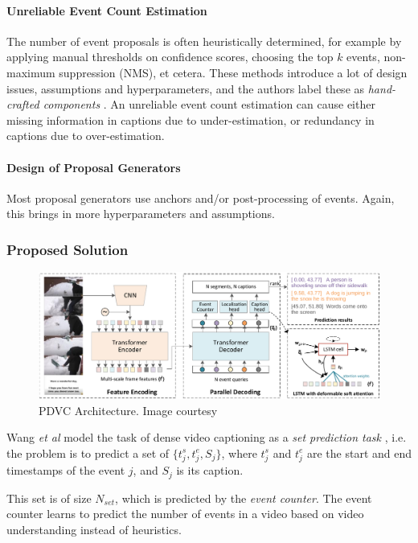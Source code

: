 \paragraph{Unreliable Event Count Estimation} The number of event proposals is often heuristically determined, for example by applying manual thresholds on confidence scores, choosing the top $k$ events, non-maximum suppression (NMS), et cetera. These methods introduce a lot of design issues, assumptions and hyperparameters, and the authors label these as \textit{hand-crafted components} \cite{wang2021endtoend}. An unreliable event count estimation can cause either missing information in captions due to under-estimation, or redundancy in captions due to over-estimation.

\paragraph{Design of Proposal Generators} Most proposal generators use anchors and/or post-processing of events. Again, this brings in more hyperparameters and assumptions.

\subsubsection{Proposed Solution}

\begin{figure}
\centering
\includegraphics[width=\linewidth]{assets/img/pdvc/arch.png}
\caption{PDVC Architecture. Image courtesy \cite{wang2021endtoend}}
\end{figure}

\par Wang \textit{et al} model the task of dense video captioning as a \textit{set prediction task} \cite{wang2021endtoend}, i.e. the problem is to predict a set of $\{t_j^s, t_j^e, S_j\}$, where $t_j^s$ and $t_j^e$ are the start and end timestamps of the event $j$, and $S_j$ is its caption. 

\par This set is of size $N_{set}$, which is predicted by the \textit{event counter}. The event counter learns to predict the number of events in a video based on video understanding instead of heuristics.

